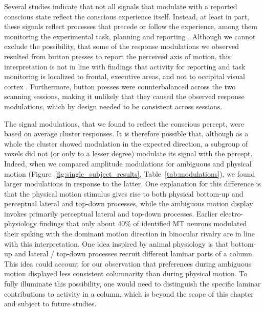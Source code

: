 Several studies indicate that not all signals that modulate with a reported conscious state reflect the conscious experience itself. Instead, at least in part, these signals reflect processes that precede or follow the experience, among them monitoring the experimental task, planning and reporting \parencite{Koch2016,DeGraaf2012,Frassle2014}. Although we cannot exclude the possibility, that some of the response modulations we observed resulted from button presses to report the perceived axis of motion, this interpretation is not in line with findings that activity for reporting and task monitoring is localized to frontal, executive areas, and not to occipital visual cortex \parencite{Frassle2014}. Furthermore, button presses were counterbalanced across the two scanning sessions, making it unlikely that they caused the observed response modulations, which by design needed to be consistent across sessions.

The signal modulations, that we found to reflect the conscious percept, were based on average cluster responses. It is therefore possible that, although as a whole the cluster showed modulation in the expected direction, a subgroup of voxels did not (or only to a lesser degree) modulate its signal with the percept. Indeed, when we compared amplitude modulations for ambiguous and physical motion (Figure~\ref{fig:single_subject_results}, Table~\ref{tab:modulations}), we found larger modulations in response to the latter. One explanation for this difference is that the physical motion stimulus gives rise to both physical bottom-up and perceptual lateral and top-down processes, while the ambiguous motion display invokes primarily perceptual lateral and top-down processes. Earlier electro-physiology findings that only about 40\% of identified MT neurons modulated their spiking with the dominant motion direction in binocular rivalry \parencite{Logothetis1989} are in line with this interpretation. One idea inspired by animal physiology \parencite{Felleman1991, Markov2014} is that bottom-up and lateral / top-down processes recruit different laminar parts of a column. This idea could account for our observation that preferences during ambiguous motion displayed less consistent columnarity than during physical motion. To fully illuminate this possibility, one would need to distinguish the specific laminar contributions to activity in a column, which is beyond the scope of this chapter and subject to future studies.

